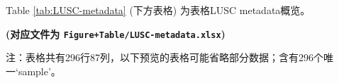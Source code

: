 \documentclass[
]{article}
\begin{document}
\begin{center}\vspace{1.5cm}\end{center}

Table \ref{tab:LUSC-metadata} (下方表格) 为表格LUSC metadata概览。

\textbf{(对应文件为 \texttt{Figure+Table/LUSC-metadata.xlsx})}

\begin{center}\begin{tcolorbox}[colback=gray!10, colframe=gray!50, width=0.9\linewidth, arc=1mm, boxrule=0.5pt]注：表格共有296行87列，以下预览的表格可能省略部分数据；含有296个唯一`sample'。
\end{tcolorbox}
\end{center}
\end{document}
